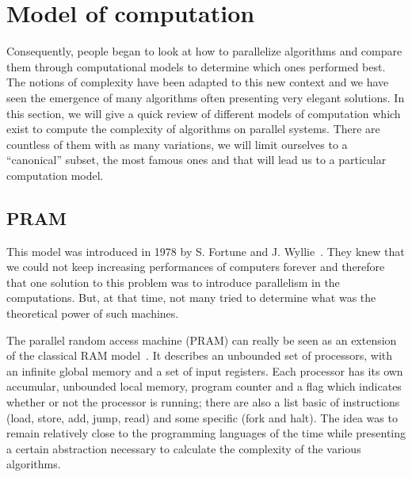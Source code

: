 
\section{Model of computation}

Consequently, people began to look at how to parallelize algorithms and compare them through computational models to determine which ones performed best. The notions of complexity have been adapted to this new context and we have seen the emergence of many algorithms often presenting very elegant solutions. In this section, we will give a quick review of different models of computation which exist to compute the complexity of algorithms on parallel systems. There are countless of them with as many variations, we will limit ourselves to a ``canonical'' subset, the most famous ones and that will lead us to a particular computation model.



\subsection{PRAM}

This model was introduced in 1978 by S. Fortune and J. Wyllie~\cite{fortune1978parallelism,wyllie1979complexity}. They knew that we could not keep increasing performances of computers forever and therefore that one solution to this problem was to introduce parallelism in the computations. But, at that time, not many tried to determine what was the theoretical power of such machines.

The parallel random access machine (PRAM) can really be seen as an extension of the classical RAM model~\cite{cook1972time}. It describes an unbounded set of processors, with an infinite global memory and a set of input registers. Each processor has its own accumular, unbounded local memory, program counter and a flag which indicates whether or not the processor is running; there are also a list basic of instructions (load, store, add, jump, read) and some specific (fork and halt). The idea was to remain relatively close to the programming languages of the time while presenting a certain abstraction necessary to calculate the complexity of the various algorithms.


